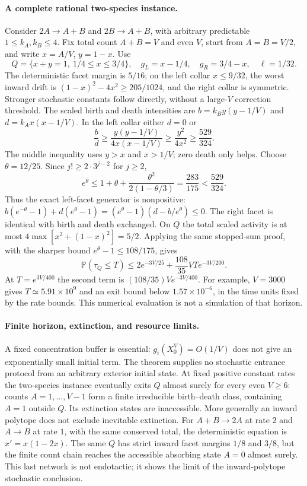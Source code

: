 \paragraph{A complete rational two-species instance.}
Consider $2A\to A+B$ and $2B\to A+B$, with arbitrary predictable
$1\le k_A,k_B\le4$. Fix total count $A+B=V$ and even $V$, start from
$A=B=V/2$, and write $x=A/V$, $y=1-x$. Use
\[
 Q=\{x+y=1,\ 1/4\le x\le3/4\},\quad
 g_L=x-1/4,\quad g_R=3/4-x,\quad\ell=1/32.
\]
The deterministic facet margin is $5/16$; on the left collar
$x\le9/32$, the worst inward drift is
$(1-x)^2-4x^2\ge205/1024$, and the right collar is symmetric.
Stronger stochastic constants follow directly, without a large-$V$
correction threshold. The scaled birth and death intensities are
$b=k_B y(y-1/V)$ and $d=k_A x(x-1/V)$.
In the left collar either $d=0$ or
\[
 \frac bd\ge\frac{y(y-1/V)}{4x(x-1/V)}
        \ge\frac{y^2}{4x^2}\ge\frac{529}{324}.
\]
The middle inequality uses $y>x$ and $x>1/V$; zero death only helps.
Choose $\theta=12/25$. Since $j!\ge2\cdot3^{j-2}$ for $j\ge2$,
\[
 e^\theta\le1+\theta+
       \frac{\theta^2}{2(1-\theta/3)}
       =\frac{283}{175}<\frac{529}{324}.
\]
Thus the exact left-facet generator is nonpositive:
$b(e^{-\theta}-1)+d(e^\theta-1)
 =(e^\theta-1)(d-b/e^\theta)\le0$.
The right facet is identical with birth and death exchanged.
On $Q$ the total scaled activity is at most
$4\max[x^2+(1-x)^2]=5/2$. Applying the same stopped-sum proof, with
the sharper bound $e^\theta-1\le108/175$, gives
\begin{equation}
 \mathbb P(\tau_Q\le T)
    \le 2e^{-3V/25}+\frac{108}{35}VT e^{-3V/200}.
 \label{eq:jump-two-species}
\end{equation}
At $T=e^{3V/400}$ the second term is
$(108/35)V e^{-3V/400}$. For example, $V=3000$ gives
$T\simeq5.91\times10^9$ and an exit bound below $1.57\times10^{-6}$,
in the time units fixed by the rate bounds. This numerical evaluation
is not a simulation of that horizon.

\paragraph{Finite horizon, extinction, and resource limits.}
A fixed concentration buffer is essential: $g_i(X^V_0)=O(1/V)$ does
not give an exponentially small initial term. The theorem supplies no
stochastic entrance protocol from an arbitrary exterior initial state.
At fixed positive constant rates the two-species instance eventually
exits $Q$ almost surely for every even $V\ge6$: counts
$A=1,\ldots,V-1$ form a finite irreducible birth--death class, containing
$A=1$ outside $Q$. Its extinction states are inaccessible.
More generally an inward polytope does not exclude inevitable
extinction. For $A+B\to2A$ at rate $2$ and $A\to B$ at rate $1$,
with the same conserved total, the deterministic equation is
$x'=x(1-2x)$. The same $Q$ has strict inward facet margins $1/8$ and
$3/8$, but the finite count chain reaches the accessible absorbing
state $A=0$ almost surely. This last network is not endotactic; it
shows the limit of the inward-polytope stochastic conclusion.

